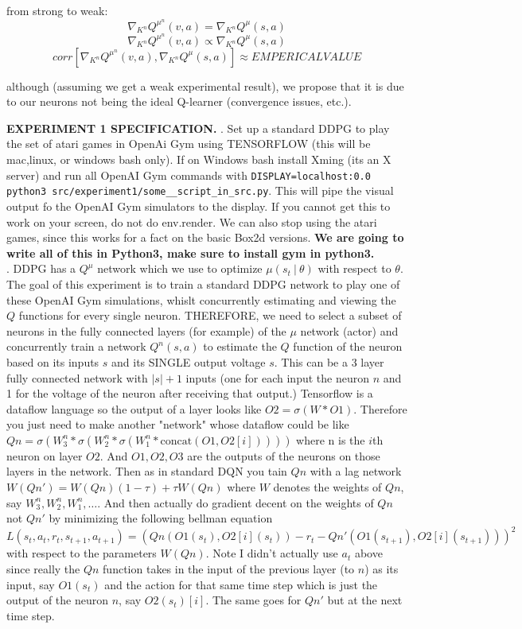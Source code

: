from strong to weak:
$$\nabla_{K^n} Q^{\mu^n}(v,a) = \nabla_{K^n} Q^{\mu}(s,a)$$
$$\nabla_{K^n} Q^{\mu^n}(v,a) \propto \nabla_{K^n} Q^{\mu}(s,a)$$
$$corr[\nabla_{K^n} Q^{\mu^n}(v,a), \nabla_{K^n} Q^{\mu}(s,a)] \approx EMPERICAL VALUE$$

although (assuming we get a weak experimental result), we propose that it is due to our neurons not being the ideal Q-learner (convergence issues, etc.).


\textbf{EXPERIMENT 1 SPECIFICATION.}
. Set up a standard DDPG to play the set of atari games in OpenAi Gym using TENSORFLOW (this will be mac,linux, or windows bash only). If on Windows bash install Xming (its an X server) and run all OpenAI Gym commands with \verb|DISPLAY=localhost:0.0 python3 src/experiment1/some__script_in_src.py|. This will pipe the visual output fo the OpenAI Gym simulators to the display. If you cannot get this to work on your screen, do not do env.render. We can also stop using the atari games, since this works for a fact on the basic Box2d versions. \textbf{We are going to write all of this in Python3, make sure to install gym in python3.}\\
. DDPG has a $Q^\mu$ network which we use to optimize $\mu(s_t\:|\: \theta)$ with respect to $\theta$. The goal of this experiment is to train a standard DDPG network to play one of these OpenAI Gym simulations, whislt concurrently estimating and viewing the $Q$ functions for every single neuron. THEREFORE, we need to select a subset of neurons in the fully connected layers (for example) of the $\mu$ network (actor) and concurrently train a network $Q^n(s,a)$ to estimate the $Q$ function of the neuron based on its inputs $s$ and its SINGLE output voltage $s$. This can be a 3 layer fully connected network with $|s| + 1$ inputs (one for each input the neuron $n$ and 1 for the voltage of the neuron after receiving that output.) Tensorflow is a dataflow language so the output of a layer looks like $O2 = \sigma(W*O1).$ Therefore you just need to make another "network" whose dataflow could be like $Qn = \sigma(W^n_3*\sigma(W^n_2*\sigma(W^n_1*\mathrm{concat}(O1, O2[i]))))$ where n is the $i$th neuron on layer $O2$. And $O1, O2, O3$ are the outputs of the neurons on those layers in the network. Then as in standard DQN you tain $Qn$ with a lag network $W(Qn') = W(Qn)(1-\tau) + \tau W(Qn)$ where $W$ denotes the weights of $Qn$, say $W^n_3, W^n_2, W^n_1, \dots$. And then actually do gradient decent on the weights of $Qn$ not $Qn'$ by minimizing the following bellman equation
\begin{equation*}
  L(s_t, a_t, r_t, s_{t+1}, a_{t+1}) = (Qn(O1(s_t),O2[i](s_t)) - r_t - Qn'(O1(s_{t+1}),O2[i](s_{t+1})))^2
\end{equation*}
with respect to the parameters $W(Qn)$. Note I didn't actually use $a_t$ above since really the $Qn$ function takes in the input of the previous layer (to $n$) as its input, say $O1(s_t)$ and the action for that same time step which is just the output of the neuron $n$, say $O2(s_t)[i]$.  The same goes for $Qn'$ but at the next time step.